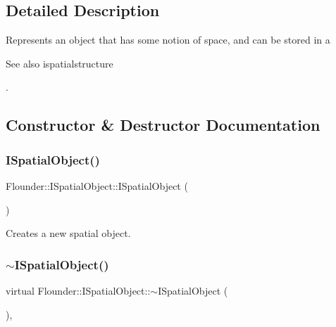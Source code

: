 \subsection{Detailed Description}
Represents an object that has some notion of space, and can be stored in a \begin{DoxySeeAlso}{See also}
ispatialstructure


\end{DoxySeeAlso}
. 



\subsection{Constructor \& Destructor Documentation}
\mbox{\label{class_flounder_1_1_i_spatial_object_a1e5a26ee3cef8547256f88cdc56feefb}} 
\subsubsection{\texorpdfstring{I\+Spatial\+Object()}{ISpatialObject()}}
{\footnotesize\ttfamily Flounder\+::\+I\+Spatial\+Object\+::\+I\+Spatial\+Object (\begin{DoxyParamCaption}{ }\end{DoxyParamCaption})\hspace{0.3cm}{\ttfamily [inline]}}



Creates a new spatial object. 

\mbox{\label{class_flounder_1_1_i_spatial_object_a146d7d07782ead201107cb8d20448a88}} 
\subsubsection{\texorpdfstring{$\sim$\+I\+Spatial\+Object()}{~ISpatialObject()}}
{\footnotesize\ttfamily virtual Flounder\+::\+I\+Spatial\+Object\+::$\sim$\+I\+Spatial\+Object (\begin{DoxyParamCaption}{ }\end{DoxyParamCaption})\hspace{0.3cm}{\ttfamily [inline]}, {\ttfamily [virtual]}}



